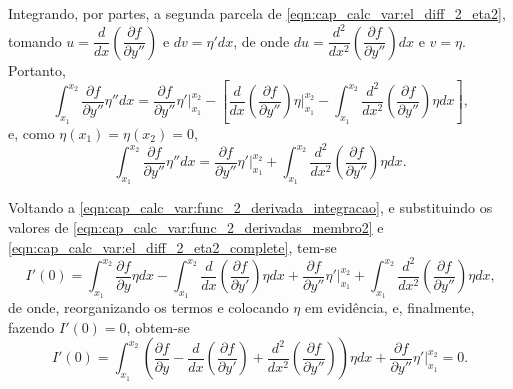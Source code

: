 \documentclass[
	12pt,				%
	openright,			%
    twoside,			%
	a4paper,			%
	english,			%
	french,				%
	spanish,			%
	brazil				%
	]{abntex2}
\numberwithin{lema}{chapter}
\numberwithin{teorema}{chapter}
\numberwithin{definicao}{chapter}
\numberwithin{exemplo}{chapter}
\numberwithin{figure}{chapter}
\begin{document}
Integrando, por partes, a segunda parcela de \eqref{eqn:cap_calc_var:el_diff_2_eta2}, tomando $u=\dfrac{d}{dx}\left (\dfrac{\partial f}{\partial y''}\right )$ e $dv=\eta'dx$, de onde $du=\dfrac{d^2}{dx^2}\left ( \dfrac{\partial f}{\partial y''} \right ) dx$ e $v=\eta$. Portanto,
$$
	\int_{x_1}^{x_2}
		\frac{\partial f}{\partial y''}
		\eta'' dx
	=
		\frac{\partial f}{\partial y''}\eta ' \Big |_{x_1}^{x_2}
		- \left [
		\frac{d}{dx} \left (
			\frac{\partial f}{\partial y''}
		\right ) \eta \Big |_{x_1}^{x_2}
		-
		\int_{x_1}^{x_2}
			\frac{d^2}{dx^2} \left (
				\frac{\partial f}{\partial y''}
			\right )
		\eta dx
	\right ]
	\text{,}
$$
e, como $\eta(x_1)=\eta(x_2)=0$,
\begin{equation}
	\label{eqn:cap_calc_var:el_diff_2_eta2_complete}
	\int_{x_1}^{x_2}
		\frac{\partial f}{\partial y''}
		\eta'' dx
	=
	\frac{\partial f}{\partial y''}\eta ' \Big |_{x_1}^{x_2}
	+
	\int_{x_1}^{x_2}
		\frac{d^2}{dx^2} \left (
			\frac{\partial f}{\partial y''}
		\right )
	\eta dx
	\text{.}
\end{equation}

Voltando a \eqref{eqn:cap_calc_var:func_2_derivada_integracao}, e substituindo os valores de \eqref{eqn:cap_calc_var:func_2_derivadas_membro2} e \eqref{eqn:cap_calc_var:el_diff_2_eta2_complete}, tem-se
$$
	I'(0)=
	\int_{x_1}^{x_2}
		\frac{\partial f}{\partial y}
		\eta dx
	-
	\int_{x_1}^{x_2}
		\frac{d}{dx}\left (
			\frac{\partial f}{\partial y'}
		\right ) \eta dx
	+
	\frac{\partial f}{\partial y''}\eta' \Big |_{x_1}^{x_2}
	+
	\int_{x_1}^{x_2}
		\frac{d^2}{dx^2}\left (
			\frac{\partial f}{\partial y''}
		\right ) \eta dx
	\text{,}
$$
de onde, reorganizando os termos e colocando $\eta$ em evidência, e, finalmente, fazendo $I'(0)=0$, obtem-se
\begin{equation}
	\label{eqn:cap_calc_var:cond_with_naturalbound}
	I'(0)=
	\int_{x_1}^{x_2}
	\left (
		\frac{\partial f}{\partial y}
	-
		\frac{d}{dx}\left (
			\frac{\partial f}{\partial y'}
		\right )
	+
		\frac{d^2}{dx^2}\left (
			\frac{\partial f}{\partial y''}
		\right )
	\right ) \eta dx
	+
	\frac{\partial f}{\partial y''}\eta' \Big |_{x_1}^{x_2}
	= 0
	\text{.}
\end{equation}
\end{document}
